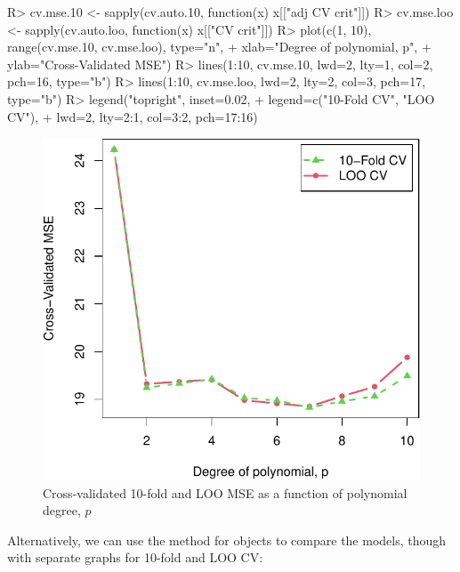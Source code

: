 \documentclass[
]{jss}
\begin{document}
\begin{CodeChunk}
\begin{CodeInput}
R> cv.mse.10 <- sapply(cv.auto.10, function(x) x[["adj CV crit"]])
R> cv.mse.loo <- sapply(cv.auto.loo, function(x) x[["CV crit"]])
R> plot(c(1, 10), range(cv.mse.10, cv.mse.loo), type="n",
+      xlab="Degree of polynomial, p",
+      ylab="Cross-Validated MSE")
R> lines(1:10, cv.mse.10, lwd=2, lty=1, col=2, pch=16, type="b")
R> lines(1:10, cv.mse.loo, lwd=2, lty=2, col=3, pch=17, type="b")
R> legend("topright", inset=0.02,
+        legend=c("10-Fold CV", "LOO CV"),
+        lwd=2, lty=2:1, col=3:2, pch=17:16)
\end{CodeInput}
\begin{figure}

{\centering \includegraphics[width=1\linewidth]{JSS-article-reduced_files/figure-latex/polynomial-regression-CV-graph-1} 

}

\caption[Cross-validated 10-fold and LOO MSE as a function of polynomial degree, $p$]{Cross-validated 10-fold and LOO MSE as a function of polynomial degree, $p$}\label{fig:polynomial-regression-CV-graph}
\end{figure}
\end{CodeChunk}

Alternatively, we can use the  method for
 objects to compare the models, though with separate
graphs for 10-fold and LOO CV:
\end{document}
